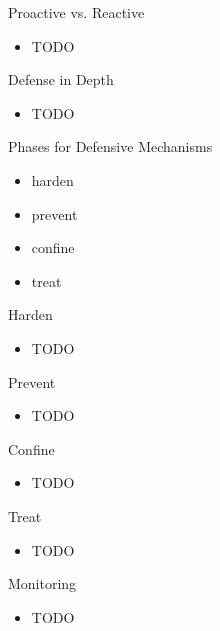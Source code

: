 \documentclass{curs}
\begin{document}
\begin{frame}{Proactive vs. Reactive}
  \begin{itemize}
    \item TODO
  \end{itemize}
\end{frame}

\begin{frame}{Defense in Depth}
  \begin{itemize}
    \item TODO
  \end{itemize}
\end{frame}

\begin{frame}{Phases for Defensive Mechanisms}
  \begin{itemize}
    \item harden
    \item prevent
    \item confine
    \item treat
  \end{itemize}
\end{frame}

\begin{frame}{Harden}
  \begin{itemize}
    \item TODO
  \end{itemize}
\end{frame}

\begin{frame}{Prevent}
  \begin{itemize}
    \item TODO
  \end{itemize}
\end{frame}

\begin{frame}{Confine}
  \begin{itemize}
    \item TODO
  \end{itemize}
\end{frame}

\begin{frame}{Treat}
  \begin{itemize}
    \item TODO
  \end{itemize}
\end{frame}

\begin{frame}{Monitoring}
  \begin{itemize}
    \item TODO
  \end{itemize}
\end{frame}
\end{document}
